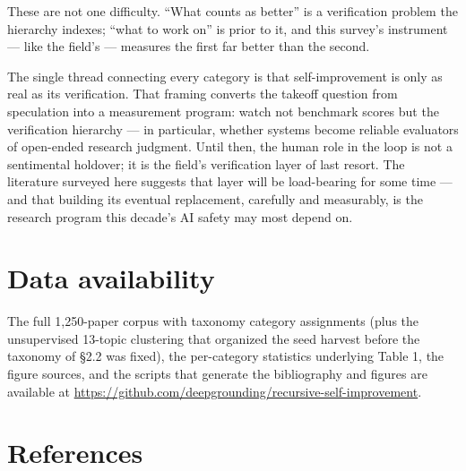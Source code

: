 \documentclass[
  11pt,
]{article}
\begin{document}
These are not one difficulty. ``What counts as better'' is a
verification problem the hierarchy indexes; ``what to work on'' is prior
to it, and this survey's instrument --- like the field's --- measures
the first far better than the second.

The single thread connecting every category is that self-improvement is
only as real as its verification. That framing converts the takeoff
question from speculation into a measurement program: watch not
benchmark scores but the verification hierarchy --- in particular,
whether systems become reliable evaluators of open-ended research
judgment. Until then, the human role in the loop is not a sentimental
holdover; it is the field's verification layer of last resort. The
literature surveyed here suggests that layer will be load-bearing for
some time --- and that building its eventual replacement, carefully and
measurably, is the research program this decade's AI safety may most
depend on.

\section{Data availability}\label{data-availability}

The full 1,250-paper corpus with taxonomy category assignments (plus the
unsupervised 13-topic clustering that organized the seed harvest before
the taxonomy of §2.2 was fixed), the per-category statistics underlying
Table 1, the figure sources, and the scripts that generate the
bibliography and figures are available at
\url{https://github.com/deepgrounding/recursive-self-improvement}.

\section{References}\label{references}


\end{document}
